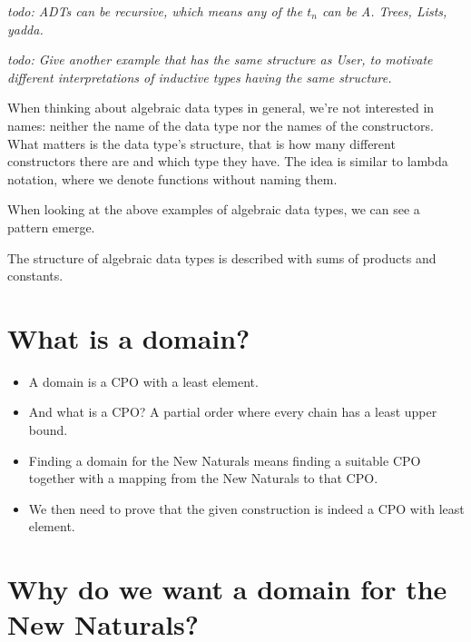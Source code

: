 \documentclass[a4paper]{article}
\newcommand{\todo}[1]{\bigskip \noindent \emph{todo: #1} \bigskip}
\begin{document}
\todo{ADTs can be recursive, which means any of the $t_n$ can be A. Trees,
Lists, yadda.}

\todo{Give another example that has the same structure as User, to motivate
different interpretations of inductive types having the same structure.}

When thinking about algebraic data types in general, we're not interested in
names: neither the name of the data type nor the names of the constructors.
What matters is the data type's structure, that is how many different
constructors there are and which type they have.  The idea is similar to lambda
notation, where we denote functions without naming them.

When looking at the above examples of algebraic data types, we can see a
pattern emerge.

The structure of algebraic data types is described with sums of products and
constants.

\section{What is a domain?}

\begin{itemize}
\item A domain is a CPO with a least element.
\item And what is a CPO?  A partial order where every chain has a least upper bound.

\item Finding a domain for the New Naturals means finding a suitable CPO
together with a mapping from the New Naturals to that CPO.

\item We then need to prove that the given construction is indeed a CPO with
least element.

\end{itemize}

\section{Why do we want a domain for the New Naturals?}
\end{document}
